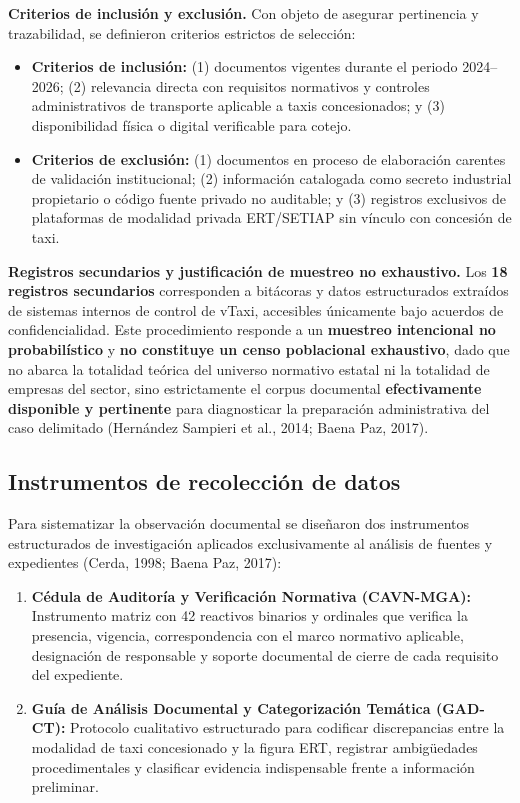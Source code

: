 {\textbf{Criterios de inclusión y exclusión.} Con objeto de asegurar pertinencia y trazabilidad, se definieron criterios estrictos de selección:
\begin{itemize}
    \item \textbf{Criterios de inclusión:} (1) documentos vigentes durante el periodo 2024--2026; (2) relevancia directa con requisitos normativos y controles administrativos de transporte aplicable a taxis concesionados; y (3) disponibilidad física o digital verificable para cotejo.
    \item \textbf{Criterios de exclusión:} (1) documentos en proceso de elaboración carentes de validación institucional; (2) información catalogada como secreto industrial propietario o código fuente privado no auditable; y (3) registros exclusivos de plataformas de modalidad privada ERT/SETIAP sin vínculo con concesión de taxi.
\end{itemize}

\textbf{Registros secundarios y justificación de muestreo no exhaustivo.} Los \textbf{18 registros secundarios} corresponden a bitácoras y datos estructurados extraídos de sistemas internos de control de vTaxi, accesibles únicamente bajo acuerdos de confidencialidad. Este procedimiento responde a un \textbf{muestreo intencional no probabilístico} y \textbf{no constituye un censo poblacional exhaustivo}, dado que no abarca la totalidad teórica del universo normativo estatal ni la totalidad de empresas del sector, sino estrictamente el corpus documental \textbf{efectivamente disponible y pertinente} para diagnosticar la preparación administrativa del caso delimitado (Hernández Sampieri et al., 2014; Baena Paz, 2017).

\subsection{Instrumentos de recolección de datos}
Para sistematizar la observación documental se diseñaron dos instrumentos estructurados de investigación aplicados exclusivamente al análisis de fuentes y expedientes (Cerda, 1998; Baena Paz, 2017):
\begin{enumerate}
    \item \textbf{Cédula de Auditoría y Verificación Normativa (CAVN-MGA):} Instrumento matriz con 42 reactivos binarios y ordinales que verifica la presencia, vigencia, correspondencia con el marco normativo aplicable, designación de responsable y soporte documental de cierre de cada requisito del expediente.
    \item \textbf{Guía de Análisis Documental y Categorización Temática (GAD-CT):} Protocolo cualitativo estructurado para codificar discrepancias entre la modalidad de taxi concesionado y la figura ERT, registrar ambigüedades procedimentales y clasificar evidencia indispensable frente a información preliminar.
\end{enumerate}

}
